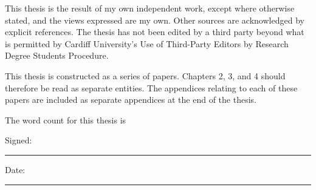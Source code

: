 
This thesis is the result of my own independent work, except where otherwise stated, and the views expressed are my own. Other sources are acknowledged by explicit references. The thesis has not been edited by a third party beyond what is permitted by Cardiff University's Use of Third-Party Editors by Research Degree Students Procedure.

This thesis is constructed as a series of papers. Chapters 2, 3, and 4 should therefore be read as separate entities. The appendices relating to each of these papers are included as separate appendices at the end of the thesis.

The word count for this thesis is

\bigskip
\noindent Signed:\\
\rule[0.5em]{25em}{0.5pt}

\bigskip
\noindent Date:\\
\rule[0.5em]{25em}{0.5pt}